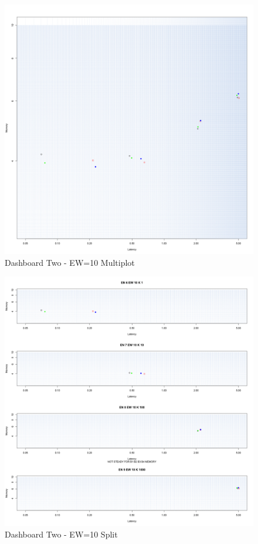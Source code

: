 \begin{figure}[h!tbp]
	\centering
	\includegraphics[width=0.90\linewidth]{images/dashboard-2}	
	\caption[\textsc{Analyser} Investigation Stack - Level 0 - Dashboard Two - Multiplot Version]{Dashboard Two - EW=10 Multiplot} 
	\label{fig:result_dashboard_ewb}
\end{figure}

\begin{figure}[h|tbp]
	\centering
	\includegraphics[width=0.90\linewidth]{images/dashboard-2-split}	
	\caption[\textsc{Analyser} Investigation Stack - Level 0 - Dashboard Two - Split Version]{Dashboard Two - EW=10 Split} 
	\label{fig:result_dashboard_ewa}
\end{figure}




